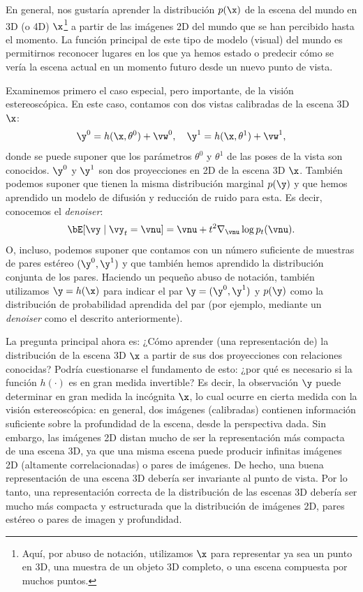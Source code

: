 \documentclass[../../book-main_es.tex]{subfiles}
\begin{document}
En general, nos gustaría aprender la distribución $p(\x)$ de la escena del mundo en 3D
(o 4D) $\x$\footnote{Aquí, por abuso de notación, utilizamos
    $\x$ para representar ya sea un punto en 3D, una muestra de un objeto 3D completo, 
o una escena compuesta por muchos puntos.} a partir de las imágenes 2D
del mundo que se han percibido hasta el momento. La función principal de este tipo de modelo
(visual) del mundo es permitirnos reconocer lugares en los que ya
hemos estado o predecir cómo se vería la escena actual en un
momento futuro desde un nuevo punto de vista.

Examinemos primero el caso especial, pero importante, de la visión estereoscópica.
En este caso, contamos con dos vistas calibradas de la escena 3D $\x$:
\begin{equation}
    \y^0 = h(\x, \theta^0) +\vw^0, \quad \y^1 = h(\x, \theta^1) +\vw^1,
\end{equation}
donde se puede suponer que los parámetros $\theta^0$ y $\theta^1$ de las poses de la vista
son conocidos. $\y^0$ y $\y^1$ son dos proyecciones en 2D de la
escena 3D $\x$. También podemos suponer que tienen la misma distribución marginal
$p(\y)$ y que hemos aprendido un modelo de difusión y reducción de ruido
para esta. Es decir, conocemos el \textit{denoiser}:
\begin{equation}
    \bE[\vy \mid \vy_t=\vnu] =
    \vnu + t^2 \nabla_{\vnu}\log p_t(\vnu).
    \label{eq:y-posterior-sampling-denoiser}
\end{equation}
O, incluso, podemos suponer que contamos con un número suficiente de
muestras de pares estéreo $(\y^0, \y^1)$ y que también hemos aprendido la
distribución conjunta de los pares. Haciendo un pequeño abuso de notación,
también utilizamos $\y = h(\x)$ para indicar el par $\y = (\y^0, \y^1)$ y
$p(\y)$ como la distribución de probabilidad aprendida del par (por ejemplo, mediante
un \textit{denoiser} como el descrito anteriormente).

La pregunta principal ahora es: ¿Cómo aprender (una representación de) la
distribución de la escena 3D $\x$ a partir de sus dos proyecciones con relaciones
conocidas?
Podría cuestionarse el fundamento de esto: ¿por qué es
necesario si la función $h(\cdot)$ es en gran medida invertible? Es decir,
la observación $\y$ puede determinar en gran medida la incógnita $\x$, lo cual
ocurre en cierta medida con la visión estereoscópica: en general, dos imágenes (calibradas)
contienen información suficiente sobre la profundidad de la escena, desde la
perspectiva dada. Sin embargo, las imágenes 2D distan mucho de ser la representación más compacta
de una escena 3D, ya que una misma escena puede producir
infinitas imágenes 2D (altamente correlacionadas) o pares de imágenes. De
hecho, una buena representación de una escena 3D debería ser invariante al
punto de vista. Por lo tanto, una representación correcta de la distribución de las escenas 3D
debería ser mucho más compacta y estructurada que la
distribución de imágenes 2D, pares estéreo o pares de imagen y profundidad.
\end{document}
